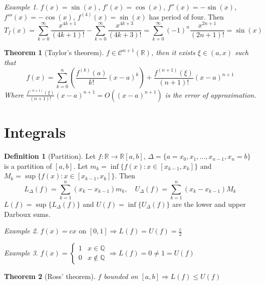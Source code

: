 \documentclass{article}
\newcommand{\Ar}{\Rightarrow}
\newcommand{\fOnR}[1]{#1 : \mathbb{R} \rightarrow \mathbb{R}}
\newcommand{\intcc}[1]{\left[#1\right]}
\newcommand{\intoo}[1]{\left(#1\right)}
\theoremstyle{definition}
\newtheorem{definition}{Definition}[section]
\theoremstyle{definition}
\theoremstyle{plain}
\newtheorem{theorem}{Theorem}[section]
\theoremstyle{plain}
\theoremstyle{plain}
\theoremstyle{plain}
\theoremstyle{definition}
\theoremstyle{remark}
\newtheorem{exampled}{Example}[definition]
\theoremstyle{remark}
\theoremstyle{remark}
\theoremstyle{remark}
\newcommand{\Q}{\mathbb{Q}}
\newcommand{\R}{\mathbb{R}}
\newcommand{\C}{\mathcal{C}}
\newcommand{\sumn}{\sum_{k=1}^n}
\begin{document}
\begin{exampled}
  $f(x) = \sin(x)$, $f'(x) = \cos(x)$, $f''(x) = -\sin(x)$, $f'''(x) = -\cos(x)$, $f^{(4)}(x) = \sin(x)$ has period of four. Then
  \[
  T_f(x) =
  \sum_{k=0}^\infty \frac{x^{4k+1}}{(4k+1)!} -
  \sum_{k=0}^\infty \frac{x^{4k+3}}{(4k+3)!} =
  \sum_{k=0}^\infty (-1)^n \frac{x^{2n+1}}{(2n+1)!} = \sin(x)
  \]
\end{exampled}


\begin{theorem}[Taylor's theorem]
  $f \in \C^{n+1}(\R)$, then it exists $\xi \in \intoo{a,x}$ such that
  \[
  f(x) =
  \sum_{k=0}^n \left( \frac{f^{(k)}(a)}{k!}(x-a)^k \right) +
  \frac{f^{(n+1)}(\xi)}{(n+1)!}(x-a)^{n+1}
  \]
  Where $\frac{f^{(n+1)}(\xi)}{(n+1)!}(x-a)^{n+1} = O((x-a)^{n+1})$ is the error of approximation.
\end{theorem}


\newpage
\section{Integrals}


\begin{definition}[Partition]
  Let $\fOnR{f}{\intcc{a,b}}$, $\Delta = \{ a = x_0, x_1, \hdots, x_{n-1}, x_n = b \}$ is a partition of $\intcc{a,b}$. Let $m_k = \inf \{ f(x) : x \in \intcc{x_{k-1},x_k} \}$ and $M_k = \sup \{ f(x) : x \in \intcc{x_{k-1},x_k} \}$. Then
  \[
  L_\Delta(f) = \sumn (x_k - x_{k-1})m_k, \quad
  U_\Delta(f) = \sumn (x_k - x_{k-1})M_k
  \]
  $L(f) = \sup \{ L_\Delta(f) \}$ and $U(f) = \inf \{ U_\Delta(f) \}$ are the lower and upper Darboux sums.
\end{definition}

\begin{exampled}
  $f(x) = cx$ on $\intcc{0,1} \Ar L(f) = U(f) = \frac{c}{2}$
\end{exampled}

\begin{exampled}
  $f(x) = \begin{cases}1 & x \in \Q \\ 0 & x \notin \Q\end{cases} \Ar L(f) = 0 \neq 1 = U(f)$
\end{exampled}


\begin{theorem}[Ross' theorem]
  $f$ bounded on $\intcc{a,b} \Ar L(f) \leq U(f)$
\end{theorem}
\end{document}
